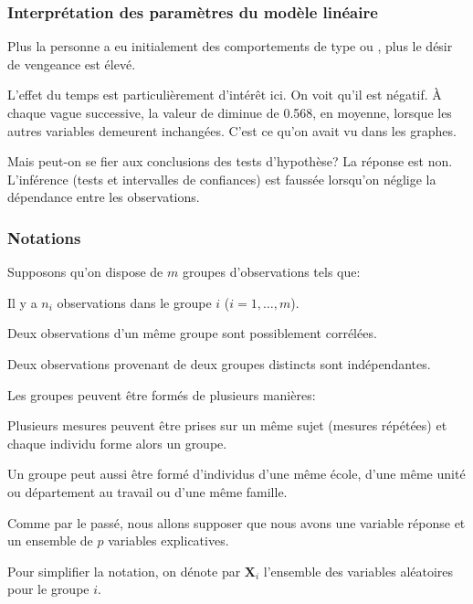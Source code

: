 \documentclass{beamer}
\begin{document}
 \begin{frame}
\frametitle{Interprétation des paramètres du modèle linéaire}
\bi
\item  Plus la personne a eu initialement des comportements de type  ou , plus le désir de vengeance est élevé. 
\item L'effet du temps est particulièrement d'intérêt ici. On voit qu'il est négatif. À chaque vague successive, la valeur de  diminue de 0.568, en moyenne, lorsque les autres variables demeurent inchangées. C'est ce qu'on avait vu dans les graphes.
\item \alert{Mais peut-on se fier aux conclusions des tests d'hypothèse?} La réponse est non. L'inférence (tests et intervalles de confiances) est faussée lorsqu'on néglige la dépendance entre les observations.
\ei
\end{frame}


\begin{frame}
\frametitle{Notations}
\bi
\item Supposons qu'on dispose de $m$ groupes d'observations tels que:
\be
\item Il y a $n_i$ observations dans le groupe $i$ ($i=1, \ldots, m$).
\item Deux observations d'un même groupe sont possiblement corrélées.
\item Deux observations provenant de deux groupes distincts sont
indépendantes.
\ee
\item Les groupes peuvent être formés de plusieurs manières:
\bi
\item Plusieurs mesures peuvent être prises sur un même sujet (mesures répétées) et chaque individu forme alors un groupe. 
\item Un groupe peut aussi être formé
d'individus d'une même école, d'une même unité ou département au travail ou
d'une même famille. 
\ei
\item Comme par le passé, nous allons supposer que nous avons une variable réponse
 et un ensemble de $p$ variables explicatives.
\item Pour simplifier la notation, on dénote par $\mathbf{X}_i$ l'ensemble des variables aléatoires pour le groupe $i$.
\ei
\end{frame}
\end{document}
